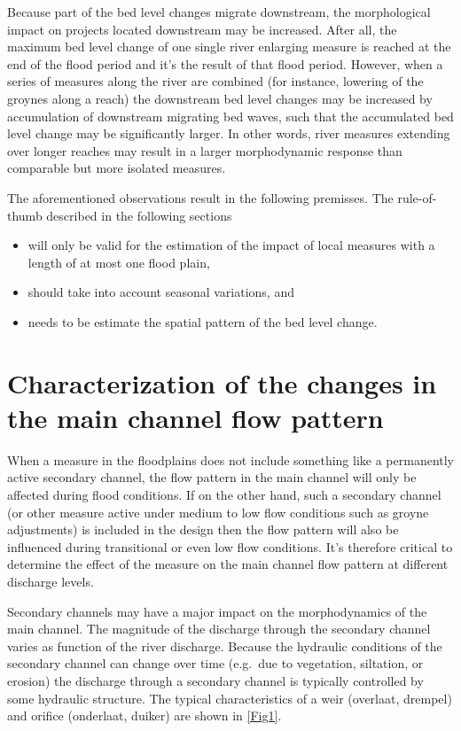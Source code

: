 Because part of the bed level changes migrate downstream, the morphological impact on projects located downstream may be increased.
After all, the maximum bed level change of one single river enlarging measure is reached at the end of the flood period and it's the result of that flood period.
However, when a series of measures along the river are combined (for instance, lowering of the groynes along a reach) the downstream bed level changes may be increased by accumulation of downstream migrating bed waves, such that the accumulated bed level change may be significantly larger.
In other words, river measures extending over longer reaches may result in a larger morphodynamic response than comparable but more isolated measures.

The aforementioned observations result in the following premisses.
The rule-of-thumb described in the following sections

\begin{itemize}
\item will only be valid for the estimation of the impact of local measures with a length of at most one flood plain,

\item should take into account seasonal variations, and

\item needs to be estimate the spatial pattern of the bed level change.
\end{itemize}


\section{Characterization of the changes in the main channel flow pattern}

When a measure in the floodplains does not include something like a permanently active secondary channel, the flow pattern in the main channel will only be affected during flood conditions.
If on the other hand, such a secondary channel (or other measure active under medium to low flow conditions such as groyne adjustments) is included in the design then the flow pattern will also be influenced during transitional or even low flow conditions.
It's therefore critical to determine the effect of the measure on the main channel flow pattern at different discharge levels.

Secondary channels may have a major impact on the morphodynamics of the main channel.
The magnitude of the discharge through the secondary channel varies as function of the river discharge.
Because the hydraulic conditions of the secondary channel can change over time (e.g.~due to vegetation, siltation, or erosion) the discharge through a secondary channel is typically controlled by some hydraulic structure.
The typical characteristics of a weir (overlaat, drempel) and orifice (onderlaat, duiker) are shown in \autoref{Fig1}.


